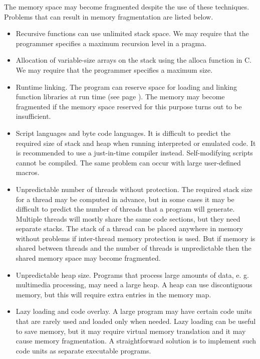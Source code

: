 \documentclass[forwardcom.tex]{subfiles}
\begin{document}
The memory space may become fragmented despite the use of these techniques. Problems that can result in memory fragmentation are listed below. 

\begin{itemize}
\item Recursive functions can use unlimited stack space. We may require that the programmer specifies a maximum recursion level in a pragma.

\item Allocation of variable-size arrays on the stack using the alloca function in C. We may require that the programmer specifies a maximum size. 

\item Runtime linking. The program can reserve space for loading and linking function libraries at run time (see page \pageref{runtimeLinking}). The memory may become fragmented if the memory space reserved for this purpose turns out to be insufficient.

\item Script languages and byte code languages. It is difficult to predict the required size of stack and heap when running interpreted or emulated code. It is recommended to use a just-in-time compiler instead. Self-modifying scripts cannot be compiled. The same problem can occur with large user-defined macros.

\item Unpredictable number of threads without protection. The required stack size for a thread may be computed in advance, but in some cases it may be difficult to predict the number of threads that a program will generate. Multiple threads will mostly share the same code sections, but they need separate stacks. The stack of a thread can be placed anywhere in memory without problems if inter-thread memory protection is used. But if memory is shared between threads and the number of threads is unpredictable then the shared 
memory space may become fragmented. 

\item Unpredictable heap size. Programs that process large amounts of data, e. g. multimedia processing, may need a large heap. A heap can use discontiguous memory, but this will require extra entries in the memory map. 

\item Lazy loading and code overlay. A large program may have certain code units that are rarely used and loaded only when needed. Lazy loading can be useful to save memory, but it may require virtual memory translation and it may cause memory fragmentation. A straightforward solution is to implement such code units as separate executable programs. 


\end{itemize}
\end{document}
